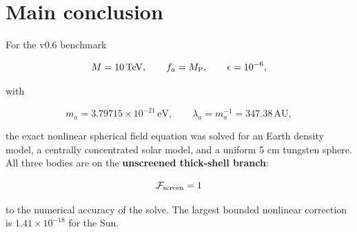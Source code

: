 \documentclass[11pt,a4paper]{article}
\begin{document}

\begin{abstract}
We solve the nonlinear finite-density field equation of the $Z_6$-protected QCD chronometry model for Earth, solar and laboratory sources. Visible matter contributes through the threshold law $m_A(x)/m_A(\pi/2)=[1-\epsilon\cos x]^{p_A}$, with $p_A\le 2/27$. The local homogeneous potential has a spinodal at $t_*=0.1727234$, corresponding to $46.25\,\mathrm{g\,cm^{-3}}$ for the benchmark. The solar core exceeds this density, so an infinite medium would lose the metastable branch connected to $x=\pi/2$. A finite body, however, must also pay gradient energy. We derive a necessary spherical phase-conversion condition $q(R_c)>q_{\rm conv}=0.633135$, where $q(R_c)=M(<R_c)p\epsilon/(4\pi f_a^2R_c)$. The largest value in the modeled Sun is $6.43\times10^{-13}$. Exact adaptive boundary-value solutions give screening factors equal to unity to numerical precision for all three sources. The protected $2/27$ QCD response is therefore not screened, while source-induced clock shifts remain small because $d_g=7.41\times10^{-8}$. We identify cosmological vacuum/domain selection, rather than terrestrial or solar screening, as the next decisive problem.
\end{abstract}

\setcounter{tocdepth}{1}
\begingroup
\small
\setlength{\parskip}{0pt}
\tableofcontents
\endgroup
\clearpage
{}
\section{Main conclusion}\label{main-conclusion}

For the v0.6 benchmark

\[
M=10\,\mathrm{TeV},\qquad f_a=M_{\rm P},\qquad \epsilon=10^{-6},
\]

with

\[
m_a=3.79715\times10^{-21}\,\mathrm{eV},\qquad
\lambda_a=m_a^{-1}=347.38\,\mathrm{AU},
\]

the exact nonlinear spherical field equation was solved for an Earth
density model, a centrally concentrated solar model, and a uniform 5 cm
tungsten sphere. All three bodies are on the \textbf{unscreened
thick-shell branch}:

\[
\mathcal F_{\rm screen}=1
\]

to the numerical accuracy of the solve. The largest bounded nonlinear
correction is \(1.41\times10^{-18}\) for the Sun.
\end{document}
